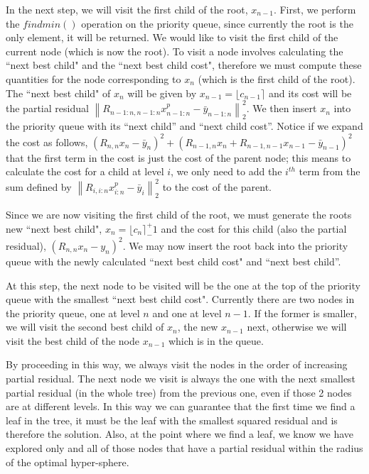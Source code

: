 \documentclass[12pt,Bold,letterpaper]{mcgilletdclass}
\begin{document}
In the next step, we will visit the first child of the root, $x_{n-1}$. First, we perform the $findmin()$ operation on the priority queue, since currently the root is the only element, it will be returned. We would like to visit the first child of the current node (which is now the root). To visit a node involves calculating the ``next best child" and the ``next best child cost", therefore we must compute these quantities for the node corresponding to $x_{n}$ (which is the first child of the root). The ``next best child" of $x_n$ will be given by $x_{n-1} = \lfloor c_{n-1} \rceil$ and its cost  will be the partial residual $\left \| R_{n-1:n,n-1:n}x_{n-1:n}^p - \bar{y}_{n-1:n}\right \|_2^2$. We then insert $x_n$ into the priority queue with its ``next child'' and ``next child cost''. Notice if we expand the cost as follows, $(R_{n,n}x_n - \bar{y}_n)^2 + (R_{n-1,n}x_n + R_{n-1,n-1}x_{n-1} - \bar{y}_{n-1})^2$ that the first term in the cost is just the cost of the parent node; this means to calculate the cost for a child at level $i$, we only need to add the $i^{th}$ term from the sum defined by $\left \| R_{i,i:n}x_{i:n}^p - \bar{y}_{i}\right \|_2^2$ to the cost of the parent.

Since we are now visiting the first child of the root, we must generate the roots new ``next best child", $x_n = \lfloor c_n \rceil ^+_- 1$ and the cost for this child (also the partial residual), $(R_{n,n}x_n - y_n)^2$. We may now insert the root back into the priority queue with the newly calculated ``next best child cost" and ``next best child''.
 
At this step, the next node to be visited will be the one at the top of the priority queue with the smallest ``next best child cost". Currently there are two nodes in the priority queue, one at level $n$ and one at level $n-1$. If the former is smaller, we will visit the second best child of $x_n$, the new $x_{n-1}$ next, otherwise we will visit the best child of the node $x_{n-1}$ which is in the queue.

By proceeding in this way, we always visit the nodes in the order of increasing partial residual. The next node we visit is always the one with the next smallest partial residual (in the whole tree) from the previous one, even if those 2 nodes are at different levels. In this way we can guarantee that the first time we find a leaf in the tree, it must be the leaf with the smallest squared residual and is therefore the solution. Also, at the point where we find a leaf, we know we have explored only and all of those nodes that have a partial residual within the radius of the optimal hyper-sphere.
\end{document}
